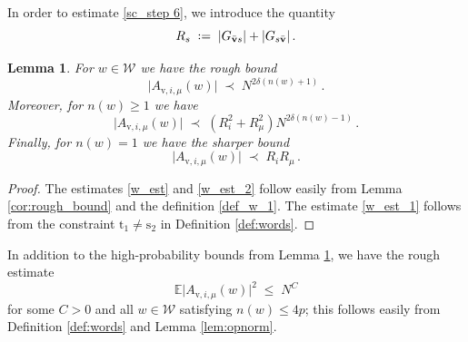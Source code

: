 \documentclass[11pt]{article} %
\numberwithin{equation}{section}
\numberwithin{figure}{section}
\theoremstyle{plain} %
\newtheorem{lemma}[theorem]{Lemma}
\theoremstyle{definition} %
\newcommand{\f}[1]{\boldsymbol{\mathrm{#1}}} %
\renewcommand{\cal}{\mathcal}
\newcommand{\E}{\mathbb{E}}
\newcommand*{\deq}{\mathrel{\vcenter{\baselineskip0.65ex \lineskiplimit0pt \hbox{.}\hbox{.}}}=}
\renewcommand{\leq}{\leqslant}
\renewcommand{\geq}{\geqslant}
\newcommand{\abs}[1]{\lvert #1 \rvert}
\begin{document}
In order to estimate \eqref{sc_step 6}, we introduce the quantity
\begin{equation*}
R_s \;\deq\; \abs{G_{\bar {\f v} s}} + \abs{G_{s \bar {\f v}}}\,.
\end{equation*}

\begin{lemma} \label{lem:w_est}
For $w \in \cal W$ we have the rough bound
\begin{equation} \label{w_est}
\abs{A_{\f v,i, \mu}(w)} \;\prec\; N^{2 \delta (n(w) + 1)}\,.
\end{equation}
Moreover, for $n(w) \geq 1$ we have
\begin{equation} \label{w_est_2}
\abs{A_{\f v,i, \mu}(w)} \;\prec\; (R_i^2 + R_\mu^2) N^{2 \delta (n(w) - 1)}\,.
\end{equation}
Finally, for $n(w) = 1$ we have the sharper bound
\begin{equation} \label{w_est_1}
\abs{A_{\f v,i, \mu}(w)} \;\prec\; R_i R_\mu\,.
\end{equation}
\end{lemma}
\begin{proof}
The estimates \eqref{w_est} and \eqref{w_est_2} follow easily from Lemma \ref{cor:rough_bound} and the definition \eqref{def_w_1}. The estimate \eqref{w_est_1} follows from the constraint $\f t_1 \neq \f s_2$ in Definition \ref{def:words}.
\end{proof}


In addition to the high-probability bounds from Lemma \ref{lem:w_est}, we have the rough estimate
\begin{equation} \label{A_rough}
\E \abs{A_{\f v,i,\mu}(w)}^2 \;\leq\; N^C
\end{equation}
for some $C > 0$ and all $w \in \cal W$ satisfying $n(w) \leq 4p$; this follows easily from Definition \ref{def:words} and Lemma \ref{lem:opnorm}.
\end{document}
